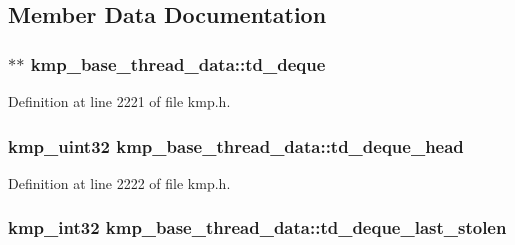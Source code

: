 \subsection{Member Data Documentation}
\hypertarget{structkmp__base__thread__data_a2617b7a1131d390a44e66b6fd7e27b59}{
\subsubsection[{td\-\_\-deque}]{$\ast$$\ast$ kmp\-\_\-base\-\_\-thread\-\_\-data\-::td\-\_\-deque}}\label{structkmp__base__thread__data_a2617b7a1131d390a44e66b6fd7e27b59}


Definition at line 2221 of file kmp.\-h.

\hypertarget{structkmp__base__thread__data_a13c57d375dcf1c348424a30ff4ec1342}{
\subsubsection[{td\-\_\-deque\-\_\-head}]{\setlength{\rightskip}{0pt plus 5cm}kmp\-\_\-uint32 kmp\-\_\-base\-\_\-thread\-\_\-data\-::td\-\_\-deque\-\_\-head}}\label{structkmp__base__thread__data_a13c57d375dcf1c348424a30ff4ec1342}


Definition at line 2222 of file kmp.\-h.

\hypertarget{structkmp__base__thread__data_ac5ff1b2c89bea039db24f574ad06b3f4}{
\subsubsection[{td\-\_\-deque\-\_\-last\-\_\-stolen}]{\setlength{\rightskip}{0pt plus 5cm}kmp\-\_\-int32 kmp\-\_\-base\-\_\-thread\-\_\-data\-::td\-\_\-deque\-\_\-last\-\_\-stolen}}\label{structkmp__base__thread__data_ac5ff1b2c89bea039db24f574ad06b3f4}


